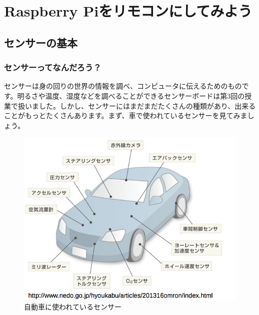 \chapter{Raspberry Piをリモコンにしてみよう}
\section{センサーの基本}
\subsection{センサーってなんだろう？}
センサーは身の回りの世界の情報を調べ、コンピュータに伝えるためのものです。明るさや温度、湿度などを調べることができるセンサーボードは第3回の授業で扱いました。しかし、センサーにはまだまだたくさんの種類があり、出来ることがもっとたくさんあります。まず、車で使われているセンサーを見てみましょう。

\begin{figure}[htb]
\begin{center}
    \includegraphics[scale=1.0]{images/chap05/text05-img001.png}
    \caption{自動車に使われているセンサー}
    \label{fig1}
\end{center}
\end{figure}

